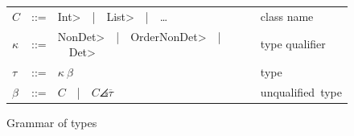 % 
% 
% 
% 





\begin{figure}
  \newcommand{\bnfalt}{\ \ |\ \ }
  \begin{tabular}{lcll}
    $C$ & ::= & \<Int>\bnfalt \<List>\bnfalt \ldots & class name \\
    $\kappa$ & ::= & \<NonDet>\bnfalt \<OrderNonDet>\bnfalt\<Det> & type qualifier \\
    $\tau$ & ::= & $\kappa\ \beta$ & \mbox{type} \\
    $\beta$ & ::= & $C$\bnfalt $C\angles{\overline{\tau}}$ 
    & \mbox{unqualified type}
  \end{tabular}
  \caption{Grammar of types}
  \label{fig:grammar}
\end{figure}


